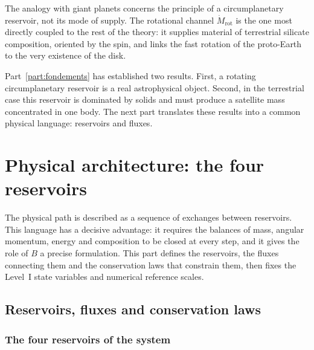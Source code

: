 \documentclass[11pt,a4paper,openany]{report}
\begin{document}
\begin{lecture}
The analogy with giant planets concerns the principle of a circumplanetary reservoir, not its mode
of supply. The rotational channel $\dot M_{\mathrm{rot}}$ is the one most directly coupled to the
rest of the theory: it supplies material of terrestrial silicate composition, oriented by the spin,
and links the fast rotation of the proto-Earth to the very existence of the disk.
\end{lecture}


\begin{rappel}
Part~\ref{part:fondements} has established two results. First, a rotating circumplanetary reservoir
is a real astrophysical object. Second, in the terrestrial case this reservoir is dominated by
solids and must produce a satellite mass concentrated in one body. The next part translates these
results into a common physical language: reservoirs and fluxes.
\end{rappel}

\part{Physical architecture: the four reservoirs}
\label{part:architecture}

\noindent
The physical path is described as a sequence of exchanges between reservoirs. This language has a
decisive advantage: it requires the balances of mass, angular momentum, energy and composition to
be closed at every step, and it gives the role of $B$ a precise formulation. This part defines the
reservoirs, the fluxes connecting them and the conservation laws that constrain them, then fixes
the Level~I state variables and numerical reference scales.

\chapter{Reservoirs, fluxes and conservation laws}
\label{ch:reservoirs}

\section{The four reservoirs of the system}
\end{document}

